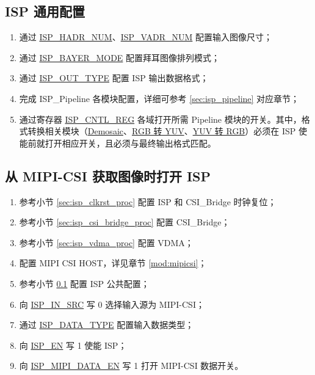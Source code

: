 \documentclass[main\_\_CN.tex]{subfiles}
\begin{document}
\subsection{ISP 通用配置}
\label{sec:isp_common_proc}
\begin{enumerate}
    \item 通过 \hyperref[fielddesc:ISPHADRNUM]{ISP\_HADR\_NUM}、\hyperref[fielddesc:ISPVADRNUM]{ISP\_VADR\_NUM} 配置输入图像尺寸；

    \item 通过 \hyperref[fielddesc:ISPBAYERMODE]{ISP\_BAYER\_MODE} 配置拜耳图像排列模式；

    \item 通过 \hyperref[fielddesc:ISPOUTTYPE]{ISP\_OUT\_TYPE} 配置 ISP 输出数据格式；

    \item 完成 ISP\_Pipeline 各模块配置，详细可参考 \ref{sec:isp_pipeline} 对应章节；

    \item 通过寄存器 \hyperref[regdesc:ISPCNTLREG]{ISP\_CNTL\_REG} 各域打开所需 Pipeline 模块的开关。其中，格式转换相关模块（\hyperref[sec:isp_demosaic]{Demosaic}、\hyperref[sec:isp_rgb2yuv]{RGB 转 YUV}、\hyperref[sec:isp_yuv2rgb]{YUV 转 RGB}）必须在 ISP 使能前就打开相应开关，且必须与最终输出格式匹配。
\end{enumerate}

\subsection{从 MIPI-CSI 获取图像时打开 ISP}
\begin{enumerate}
    \item 参考小节 \ref{sec:isp_clkrst_proc} 配置 ISP 和 CSI\_Bridge 时钟复位；

    \item 参考小节 \ref{sec:isp_csi_bridge_proc} 配置 CSI\_Bridge；

    \item 参考小节 \ref{sec:isp_vdma_proc} 配置 VDMA；

    \item 配置 MIPI CSI HOST，详见章节 \ref{mod:mipicsi}；

    \item 参考小节 \ref{sec:isp_common_proc} 配置 ISP 公共配置；

    \item 向 \hyperref[fielddesc:ISPINSRC]{ISP\_IN\_SRC} 写 0 选择输入源为 MIPI-CSI；

    \item 通过 \hyperref[fielddesc:ISPDATATYPE]{ISP\_DATA\_TYPE} 配置输入数据类型；

    \item 向 \hyperref[fielddesc:ISPEN]{ISP\_EN} 写 1 使能 ISP；

    \item 向 \hyperref[fielddesc:ISPMIPIDATAEN]{ISP\_MIPI\_DATA\_EN} 写 1 打开 MIPI-CSI 数据开关。
\end{enumerate}
\end{document}

